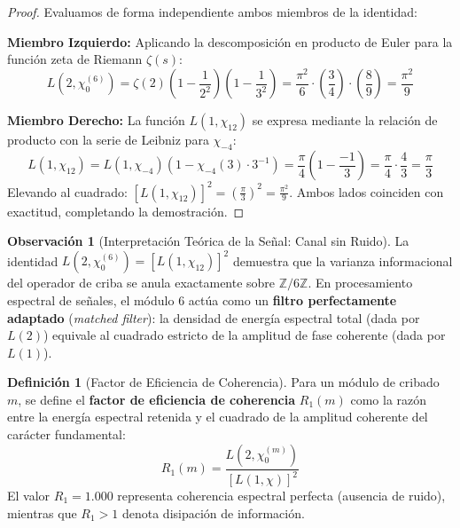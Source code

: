 \documentclass{article}
\numberwithin{equation}{section}
\theoremstyle{plain}
\theoremstyle{definition}
\newtheorem{definition}[theorem]{Definición}
\newtheorem{remark}[theorem]{Observación}
\begin{document}
\begin{proof}
Evaluamos de forma independiente ambos miembros de la identidad:

\noindent\textbf{Miembro Izquierdo:} Aplicando la descomposición en producto de Euler para la función zeta de Riemann $\zeta(s)$:
\begin{equation}
L(2, \chi_0^{(6)}) = \zeta(2) \left(1 - \frac{1}{2^2}\right) \left(1 - \frac{1}{3^2}\right) = \frac{\pi^2}{6} \cdot \left(\frac{3}{4}\right) \cdot \left(\frac{8}{9}\right) = \frac{\pi^2}{9}
\end{equation}

\noindent\textbf{Miembro Derecho:} La función $L(1, \chi_{12})$ se expresa mediante la relación de producto con la serie de Leibniz para $\chi_{-4}$:
\begin{equation}
L(1, \chi_{12}) = L(1, \chi_{-4}) \left(1 - \chi_{-4}(3) \cdot 3^{-1}\right) = \frac{\pi}{4} \left(1 - \frac{-1}{3}\right) = \frac{\pi}{4} \cdot \frac{4}{3} = \frac{\pi}{3}
\end{equation}
Elevando al cuadrado: $[L(1, \chi_{12})]^2 = \left(\frac{\pi}{3}\right)^2 = \frac{\pi^2}{9}$. Ambos lados coinciden con exactitud, completando la demostración.
\end{proof}

\begin{remark}[Interpretación Teórica de la Señal: Canal sin Ruido]
La identidad $L(2, \chi_0^{(6)}) = [L(1, \chi_{12})]^2$ demuestra que la varianza informacional del operador de criba se anula exactamente sobre $\mathbb{Z}/6\mathbb{Z}$. En procesamiento espectral de señales, el módulo 6 actúa como un \textbf{filtro perfectamente adaptado} (\textit{matched filter}): la densidad de energía espectral total (dada por $L(2)$) equivale al cuadrado estricto de la amplitud de fase coherente (dada por $L(1)$).
\end{remark}

\begin{definition}[Factor de Eficiencia de Coherencia]
\label{def:R1}
Para un módulo de cribado $m$, se define el \textbf{factor de eficiencia de coherencia} $R_1(m)$ como la razón entre la energía espectral retenida y el cuadrado de la amplitud coherente del carácter fundamental:
\begin{equation}
R_1(m) = \frac{L(2, \chi_0^{(m)})}{\left[ L(1, \chi) \right]^2}
\end{equation}
El valor $R_1 = 1.000$ representa coherencia espectral perfecta (ausencia de ruido), mientras que $R_1 > 1$ denota disipación de información.
\end{definition}
\end{document}
